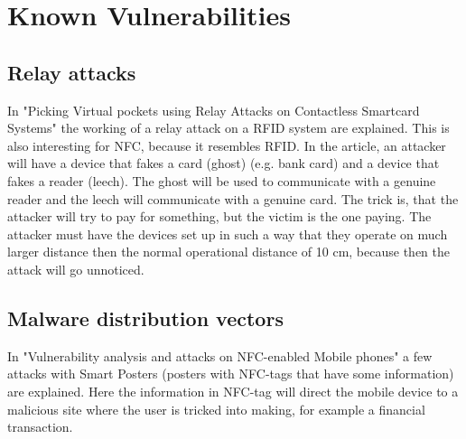\chapter{Known Vulnerabilities}
\label{chap:known_vulnerabilities}

\section{Relay attacks}
In "Picking Virtual pockets using Relay Attacks on Contactless Smartcard Systems" the working of a relay attack on  a RFID system are explained.
This is also interesting for NFC, because it resembles RFID.
In the article, an attacker will have a device that fakes a card (ghost) (e.g. bank card) and a device that fakes a reader (leech). 
The ghost will be used to communicate with a genuine reader and the leech will communicate with a genuine card.
The trick is, that the attacker will try to pay for something, but the victim is the one paying.
The attacker must have the devices set up in such a way that they operate on much larger distance then the normal operational distance of 10 cm, because then the attack will go unnoticed.


\section{Malware distribution vectors}
In "Vulnerability analysis and attacks on NFC-enabled Mobile phones" a few attacks with Smart Posters (posters with NFC-tags that have some information) are explained.
Here the information in NFC-tag will direct the mobile device to a malicious site where the user is tricked into making, for example a financial transaction.


